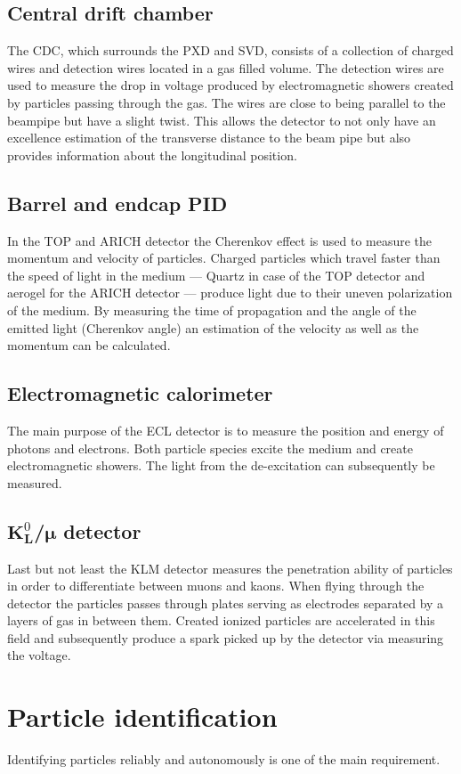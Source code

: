 \subsection{Central drift chamber}
\label{subsec:detector_system_tracking_detectors}

The CDC, which surrounds the PXD and SVD, consists of a collection of charged wires and detection wires located in a gas filled volume. The detection wires are used to measure the drop in voltage produced by electromagnetic showers created by particles passing through the gas. The wires are close to being parallel to the beampipe but have a slight twist. This allows the detector to not only have an excellence estimation of the transverse distance to the beam pipe but also provides information about the longitudinal position.

\subsection{Barrel and endcap PID}
\label{subsec:detector_system_barrel_and_endcap_pid}

In the TOP and ARICH detector the Cherenkov effect is used to measure the momentum and velocity of particles. Charged particles which travel faster than the speed of light in the medium --- Quartz in case of the TOP detector and aerogel for the ARICH detector --- produce light due to their uneven polarization of the medium. By measuring the time of propagation and the angle of the emitted light (Cherenkov angle) an estimation of the velocity as well as the momentum can be calculated.

\subsection{Electromagnetic calorimeter}
\label{subsec:detector_system_electromagnetic_calorimeter}

The main purpose of the ECL detector is to measure the position and energy of photons and electrons. Both particle species excite the medium and create electromagnetic showers. The light from the de-excitation can subsequently be measured.

\subsection{$\boldsymbol{K}^0_{\boldsymbol{L}}$/$\boldsymbol{\mu}$ detector}
\label{subsec:detector_system_k0lmu}

Last but not least the KLM detector measures the penetration ability of particles in order to differentiate between muons and kaons. When flying through the detector the particles passes through plates serving as electrodes separated by a layers of gas in between them. Created ionized particles are accelerated in this field and subsequently produce a spark picked up by the detector via measuring the voltage.

\section{Particle identification}
\label{sec:particle_identification}

Identifying particles reliably and autonomously is one of the main requirement.
